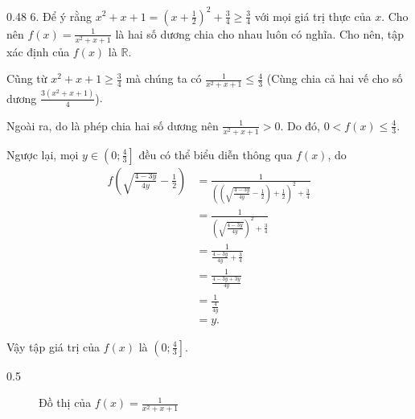 {
   \begin{minipageindent}{0.48\textwidth}
      6. Để ý rằng $x^2 + x + 1 = \left(x + \frac{1}{2}\right)^2 + \frac{3}{4} \geq \frac{3}{4}$ với mọi giá trị thực của $x$. Cho nên $f(x) = \frac{1}{x^2 + x + 1}$ là hai số dương chia cho nhau luôn có nghĩa. Cho nên, tập xác định của $f(x)$ là $\mathbb{R}$.

      Cũng từ $x^2 + x + 1 \geq \frac{3}{4}$ mà chúng ta có $\frac{1}{x^2 + x + 1} \leq \frac{4}{3}$ \textcolor{colorEmphasis}{(Cùng chia cả hai vế cho số dương $\frac{3(x^2 + x + 1)}{4}$)}.
      
      Ngoài ra, do là phép chia hai số dương nên $\frac{1}{x^2 + x + 1} > 0$. Do đó, $0 < f(x) \leq \frac{4}{3}$.

      Ngược lại, mọi $y \in \left(0; \frac{4}{3}\right]$ đều có thể biểu diễn thông qua $f(x)$, do 
      \begin{align*}
         f\left(\sqrt{\frac{4-3y}{4y}} - \frac{1}{2} \right) &= \frac{1}{\left(\left(\sqrt{\frac{4-3y}{4y}} - \frac{1}{2}\right) + \frac{1}{2}\right)^2 + \frac{3}{4}} \\
         &= \frac{1}{\left(\sqrt{\frac{4-3y}{4y}}\right)^2 + \frac{3}{4}} \\
         &= \frac{1}{\frac{4-3y}{4y} + \frac{3}{4}} \\
         &= \frac{1}{\frac{4-3y + 3y}{4y}} \\
         &= \frac{1}{\frac{4}{4y}} \\
         &= y.
      \end{align*}

      Vậy tập giá trị của $f(x)$ là $\left(0; \frac{4}{3}\right]$.
   \end{minipageindent}
   \hfill
   \begin{minipageindent}{0.5\textwidth}
      \begin{figure}[H]
         \centering
         \caption{Đồ thị của $f(x) = \frac{1}{x^{2} + x + 1}$}
         \label{fig:ham_so_mot_bien:phan_thuc:1_x2_1x_1}
      \end{figure}
   \end{minipageindent}
}

